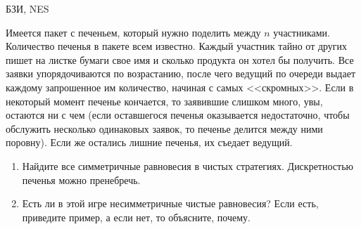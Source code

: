 \begin{problem}
\begin{source}
БЗИ, NES
\end{source} Имеется пакет с печеньем,
который нужно поделить между $n$ участниками. Количество
печенья в пакете всем известно. Каждый участник тайно от
других пишет на листке бумаги свое имя и сколько продукта
он хотел бы получить. Все заявки упорядочиваются по
возрастанию, после чего ведущий по очереди выдает каждому
запрошенное им количество, начиная с самых <<скромных>>.
Если в некоторый момент печенье кончается, то заявившие
слишком много, увы, остаются ни с чем (если оставшегося
печенья оказывается недостаточно, чтобы обслужить несколько
одинаковых заявок, то печенье делится между ними поровну). Если же
остались лишние печенья, их съедает ведущий.

\begin{enumerate}

\item Найдите все симметричные равновесия в чистых
стратегиях. Дискретностью печенья можно пренебречь.

\item Есть ли в этой игре несимметричные чистые равновесия?
Если есть, приведите пример, а если нет, то объясните,
почему.

\end{enumerate}







\begin{sol}

\end{sol}
\end{problem}
















